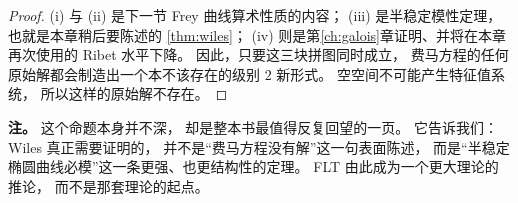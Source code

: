 \begin{proof}
(i) 与 (ii) 是下一节 Frey 曲线算术性质的内容；
(iii) 是半稳定模性定理，也就是本章稍后要陈述的 \cref{thm:wiles}；
(iv) 则是第\ref{ch:galois}章证明、并将在本章再次使用的 Ribet 水平下降。
因此，只要这三块拼图同时成立，
费马方程的任何原始解都会制造出一个本不该存在的级别 $2$ 新形式。
空空间不可能产生特征值系统，
所以这样的原始解不存在。
\end{proof}

\textbf{注。}
这个命题本身并不深，
却是整本书最值得反复回望的一页。
它告诉我们：
Wiles 真正需要证明的，
并不是“费马方程没有解”这一句表面陈述，
而是“半稳定椭圆曲线必模”这一条更强、也更结构性的定理。
FLT 由此成为一个更大理论的推论，
而不是那套理论的起点。
